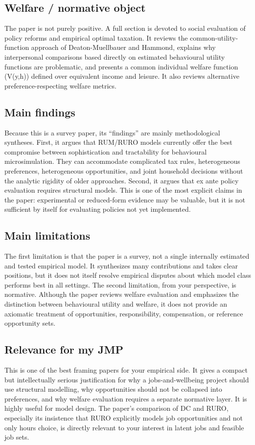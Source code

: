 \documentclass[11pt,a4paper]{article}
\begin{document}
\subsection*{Welfare / normative object}
The paper is not purely positive. A full section is devoted to social evaluation of policy reforms and empirical optimal taxation. It reviews the common-utility-function approach of Deaton-Muellbauer and Hammond, explains why interpersonal comparisons based directly on estimated behavioural utility functions are problematic, and presents a common individual welfare function (V(y,h)) defined over equivalent income and leisure. It also reviews alternative preference-respecting welfare metrics.

\subsection*{Main findings}
Because this is a survey paper, its “findings” are mainly methodological syntheses. First, it argues that RUM/RURO models currently offer the best compromise between sophistication and tractability for behavioural microsimulation. They can accommodate complicated tax rules, heterogeneous preferences, heterogeneous opportunities, and joint household decisions without the analytic rigidity of older approaches. Second, it argues that ex ante policy evaluation requires structural models. This is one of the most explicit claims in the paper: experimental or reduced-form evidence may be valuable, but it is not sufficient by itself for evaluating policies not yet implemented.

\subsection*{Main limitations}
The first limitation is that the paper is a survey, not a single internally estimated and tested empirical model. It synthesizes many contributions and takes clear positions, but it does not itself resolve empirical disputes about which model class performs best in all settings. The second limitation, from your perspective, is normative. Although the paper reviews welfare evaluation and emphasizes the distinction between behavioural utility and welfare, it does not provide an axiomatic treatment of opportunities, responsibility, compensation, or reference opportunity sets.

\subsection*{Relevance for my JMP}
This is one of the best framing papers for your empirical side. It gives a compact but intellectually serious justification for why a jobs-and-wellbeing project should use structural modelling, why opportunities should not be collapsed into preferences, and why welfare evaluation requires a separate normative layer. It is highly useful for model design. The paper’s comparison of DC and RURO, especially its insistence that RURO explicitly models job opportunities and not only hours choice, is directly relevant to your interest in latent jobs and feasible job sets.
\end{document}
